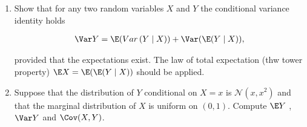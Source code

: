 
\begin{exercise}

\phantom{}
    
\begin{enumerate}[label = (\alph*)]

    \item Show that for any two random variables $X$ and $Y$ the conditional variance identity holds
    
    \begin{align*}
        \Var Y = \E(Var \, (Y \mid X)) + \Var(\E(Y \mid X)),
    \end{align*}

    provided that the expectations exist.
    The law of total expectation (thw tower property) $\E X = \E(\E(Y \mid X))$ should be applied.

    \item Suppose that the distribution of $Y$ conditional on $X = x$ is $\mathcal N (x, x^2)$ and that the marginal distribution of $X$ is uniform on $(0, 1)$.
    Compute $\E Y$ , $\Var Y$ and $\Cov(X, Y)$.

\end{enumerate}

\end{exercise}


